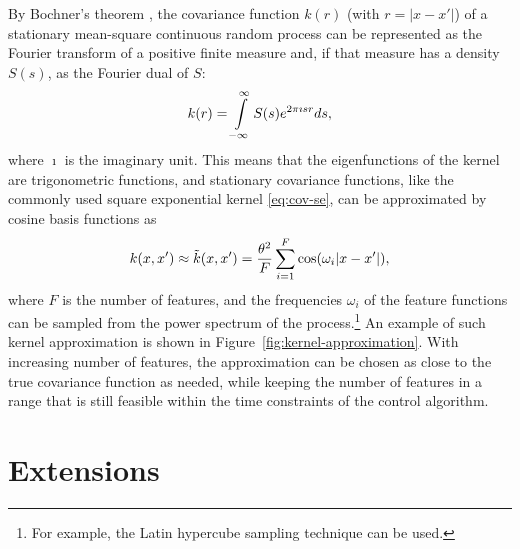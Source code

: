 By Bochner's theorem \cite[]{Stein:1999:Interpolation}, the covariance
function $k(r)$ (with $r=|x-x'|$) of a stationary mean-square continuous random
process can be represented as the Fourier transform of a positive finite measure
and, if that measure has a density $S(s)$, as the Fourier dual of $S$:
\begin{equation}
  k(r) = \int\limits_{-\infty}^\infty S(s)e^{2\pi \imath s r} ds,
\end{equation}
where $\imath$ is the imaginary unit.
This means that the eigenfunctions of the kernel are trigonometric functions,
and stationary covariance functions, like the commonly used square exponential
kernel \eqref{eq:cov-se}, can be approximated by cosine basis functions as
\begin{equation}
  k(x,x') \approx \tilde {k}(x,x') =
\frac{\theta^2}{F}\sum_{i=1}^{F} \cos(\omega_{i} |x-x'|),
\end{equation}
where $F$ is the number of features, and the frequencies $\omega_i$ of the
feature functions can be sampled from the power spectrum of the
process.\footnote{For example, the Latin hypercube sampling technique
 can be
used.} An example of such kernel
approximation is shown in Figure~\ref{fig:kernel-approximation}. With increasing
number of features, the approximation can be chosen as close to the true
covariance function as needed, while keeping the number of features in a range
that is still feasible within the time constraints of the control algorithm.

\begin{figure*}
  \setlength{}%
  \setlength\figurewidth{\textwidth}%
  \footnotesize%
  \caption[Comparison of a finite kernel approximation to the full
kernel.]{Comparison of a finite kernel approximation to the full kernel. Prior
(left), posterior (middle) and kernel function (right) of both the full kernel
function (top row) and the approximate kernel (bottom row). Shown are the mean
(\ref*{p:full-mean}/\ref*{p:approx-mean}), two standard deviations
(\ref*{p:full-std}/\ref*{p:approx-std}) and three samples each
(\ref*{p:full-sample}/\ref*{p:approx-sample})}
  \label{fig:kernel-approximation}
\end{figure*}

\section{Extensions}

